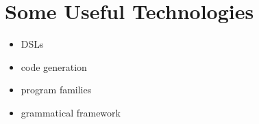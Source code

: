 \documentclass[10pt,twoside,onecolumn,openany,letterpaper]{memoir}
\begin{document}
\chapter{Some Useful Technologies}\label{ch:techniques}


\begin{itemize}
\item DSLs
\item code generation
\item program families
\item grammatical framework
\end{itemize}
\end{document}
